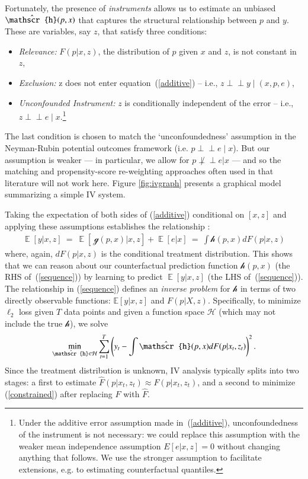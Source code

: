 \documentclass[12pt]{article}
\newcommand{\ds}[1]{\mathds{#1}}
\newcommand{\indep}{\perp\!\!\!\!\!\perp}
\newcommand{\outcome}{\ensuremath{y}}
\newcommand{\struct}{\ensuremath{~\mathscr{g}}}
\newcommand{\cf}{\ensuremath{\mathscr{h}}}
\newcommand{\cfEst}{\ensuremath{\skew{4}\hat{\mathscr{h}}}}
\newcommand{\price}{\ensuremath{p}}
\DeclareMathOperator*{\E}{\mathds{E}}
\begin{document}
Fortunately, the presence of \emph{instruments} allows us to estimate an unbiased $\cfEst(\price,x)$ that captures the structural relationship between $\price$ and $\outcome$.  These are variables, say $z$, that satisfy three conditions:
\begin{itemize}
	\item[] \emph{Relevance:} $F(\price|x,z)$, the distribution of $\price$ given $x$ and $z$, is not constant in $z$,
	\item[] \emph{Exclusion:} z does not enter equation~(\ref{additive}) -- i.e., $z \indep y \; | \; (x,p,e)$,
	\item[] \emph{Unconfounded Instrument:}  $z$ is conditionally independent of the error -- i.e., $z \indep e \; | \; x$.\footnote{Under the additive error assumption made in~(\ref{additive}), unconfoundedness of the instrument is not necessary: we could replace this assumption with the weaker mean independence assumption $E[e|x,z] = 0$ without changing anything that follows.  We use the stronger assumption to facilitate extensions, e.g. to estimating counterfactual quantiles.} 
\end{itemize}
The last condition is chosen to match the `unconfoundedness' assumption in the Neyman-Rubin potential outcomes framework \citep{rosenbaumrubin1983} (i.e. $p \indep e \; | \; x$). 
But our assumption is weaker --- in particular, we allow for $p \not \indep e | x$ --- and so the matching and propensity-score re-weighting approaches often used in that literature will not work here.    
Figure \ref{fig:ivgraph} presents a graphical model summarizing a simple IV system.

Taking the  expectation of both sides of (\ref{additive}) conditional on $[x,z]$ and applying these assumptions establishes the relationship \citep[cf.][]{newey2003instrumental}:
\begin{align}\label{sequence} \E[\outcome|x,z] %
 ~=~ \E[\struct (\price,x)|x,z] + \E[e|x] ~=~ \int \cf(\price,x) dF(\price|x,z)  \end{align}
where, again, $dF(\price|x,z)$ is the conditional treatment distribution.  This shows that we can reason about our counterfactual prediction function $\cf(\price,x)$ (the RHS of~(\ref{sequence})) by learning to predict $\E[\outcome|x,z]$ (the LHS of~(\ref{sequence})). The relationship in (\ref{sequence}) defines an {\it inverse problem} for $\cf$ in terms of two directly observable  functions: $\ds{E}[y|x,z]$ and $F(p|X,z)$.  Specifically, to minimize $\ell_2$ loss given $T$ data points and given a function space $\mathcal{H}$ (which may not include the true \cf), we solve
\begin{equation}\label{constrained} \min_{\cfEst \in \mathcal{H}} \sum_{t=1}^T\left(y_t - \int \cfEst(\price,x) dF(\price|x_t,z_t)\right)^2. \end{equation}
Since the  treatment distribution is unknown,  IV analysis typically splits into two stages: a first to estimate $\hat F(\price|x_t,z_t) \approx F(\price|x_t,z_t)$, and a second to minimize (\ref{constrained}) after replacing $F$ with $\hat F$.
\end{document}
